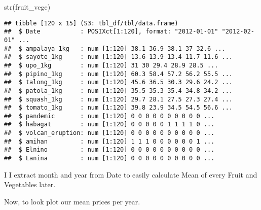 \documentclass[
]{article}
\newenvironment{Shaded}{\begin{snugshade}}{\end{snugshade}}
\newcommand{\FunctionTok}[1]{\textcolor[rgb]{0.00,0.00,0.00}{#1}}
\newcommand{\NormalTok}[1]{#1}
\newcommand{\OtherTok}[1]{\textcolor[rgb]{0.56,0.35,0.01}{#1}}
\newcommand{\SpecialCharTok}[1]{\textcolor[rgb]{0.00,0.00,0.00}{#1}}
\newcommand{\StringTok}[1]{\textcolor[rgb]{0.31,0.60,0.02}{#1}}
\begin{document}
\begin{Shaded}
\begin{Highlighting}[]
\FunctionTok{str}\NormalTok{(fruit\_vege)}
\end{Highlighting}
\end{Shaded}

\begin{verbatim}
## tibble [120 x 15] (S3: tbl_df/tbl/data.frame)
##  $ Date           : POSIXct[1:120], format: "2012-01-01" "2012-02-01" ...
##  $ ampalaya_1kg   : num [1:120] 38.1 36.9 38.1 37 32.6 ...
##  $ sayote_1kg     : num [1:120] 13.6 13.9 13.4 11.7 11.6 ...
##  $ upo_1kg        : num [1:120] 31 30 29.4 28.9 28.5 ...
##  $ pipino_1kg     : num [1:120] 60.3 58.4 57.2 56.2 55.5 ...
##  $ talong_1kg     : num [1:120] 45.6 36.5 30.3 29.6 24.2 ...
##  $ patola_1kg     : num [1:120] 35.5 35.3 35.4 34.8 34.2 ...
##  $ squash_1kg     : num [1:120] 29.7 28.1 27.5 27.3 27.4 ...
##  $ tomato_1kg     : num [1:120] 39.8 23.9 34.5 54.5 56.6 ...
##  $ pandemic       : num [1:120] 0 0 0 0 0 0 0 0 0 0 ...
##  $ habagat        : num [1:120] 0 0 0 0 0 1 1 1 1 0 ...
##  $ volcan_eruption: num [1:120] 0 0 0 0 0 0 0 0 0 0 ...
##  $ amihan         : num [1:120] 1 1 1 0 0 0 0 0 0 1 ...
##  $ Elnino         : num [1:120] 0 0 0 0 0 0 0 0 0 0 ...
##  $ Lanina         : num [1:120] 0 0 0 0 0 0 0 0 0 0 ...
\end{verbatim}

I I extract month and year from Date to easily calculate Mean of every
Fruit and Vegetables later.

\begin{Shaded}
\end{Shaded}

Now, to look plot our mean prices per year.
\end{document}
